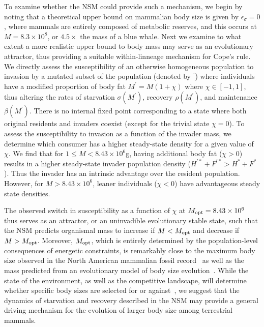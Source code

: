 \documentclass[11pt]{article}
\begin{document}
\begin{multicols}{2}
To examine whether the NSM could provide such a mechanism, we begin by noting that a theoretical upper bound on mammalian body size is given by $\epsilon_\sigma=0$, where mammals are entirely composed of metabolic reserves, and this occurs at $M=8.3\times 10^8$, or $4.5\times$ the mass of a blue whale.
Next we examine to what extent a more realistic upper bound to body mass may serve as an evolutionary attractor, thus providing a suitable within-linneage mechanism for Cope's rule. 
We directly assess the susceptibility of an otherwise homogeneous population to invasion by a mutated subset of the population (denoted by ${}^\prime$) where individuals have a modified proportion of body fat $M^\prime=M(1+\chi)$ where $\chi \in [-1,1]$, thus altering the rates of starvation $\sigma(M^\prime)$, recovery $\rho(M^\prime)$, and maintenance $\beta(M^\prime)$.  
There is no internal fixed point corresponding to a state where both original residents and invaders coexist (except for the trivial state $\chi=0$).  
To assess the susceptibility to invasion as a function of the invader mass, we determine which consumer has a higher steady-state density for a given value of $\chi$.  
We find that for $1\leq M<8.43\times 10^6$g, having additional body fat ($\chi > 0$) results in a higher steady-state invader population density ($H^{\prime *}+F^{\prime *}>H^*+F^*$).  
Thus the invader has an intrinsic advantage over the resident population.  
However, for $M>8.43\times 10^6$, leaner individuals ($\chi < 0$) have advantageous steady state densities.

The observed switch in susceptibility as a function of $\chi$ at $M_{\rm opt}=8.43 \times 10^6$ thus serves as an attractor, or an uninvadible evolutionary stable state, such that the NSM predicts organismal mass to increase if $M<M_{\rm opt}$ and decrease if $M>M_{\rm opt}$.
Moreover, $M_{\rm opt}$, which is entirely determined by the population-level consequences of energetic constraints, is remarkably close to the maximum body size observed in the North American mammalian fossil record~\cite{Alroy:1998p1594} as well as the mass predicted from an evolutionary model of body size evolution~\cite{Clauset:2009fh}.
While the state of the environment, as well as the competitive landscape, will determine whether specific body sizes are selected for or against~\cite{Saarinen:2014br}, we suggest that the dynamics of starvation and recovery described in the NSM may provide a general driving mechanism for the evolution of larger body size among terrestrial mammals.



\end{multicols}
\end{document}
